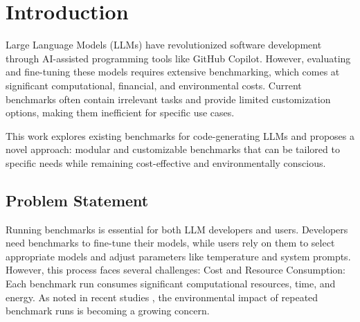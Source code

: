 %
%

\chapter{Introduction}


Large Language Models (LLMs) have revolutionized software development through AI-assisted programming tools like GitHub Copilot. However, evaluating and fine-tuning these models requires extensive benchmarking, which comes at significant computational, financial, and environmental costs. Current benchmarks often contain irrelevant tasks and provide limited customization options, making them inefficient for specific use cases.

This work explores existing benchmarks for code-generating LLMs and proposes a novel approach: modular and customizable benchmarks that can be tailored to specific needs while remaining cost-effective and environmentally conscious.

\section{Problem Statement}

Running benchmarks is essential for both LLM developers and users. Developers need benchmarks to fine-tune their models, while users rely on them to select appropriate models and adjust parameters like temperature and system prompts. However, this process faces several challenges:
Cost and Resource Consumption: Each benchmark run consumes significant computational resources, time, and energy. As noted in recent studies \cite{ ???? Cantu-Paz98asurvey ?????}, the environmental impact of repeated benchmark runs is becoming a growing concern.

